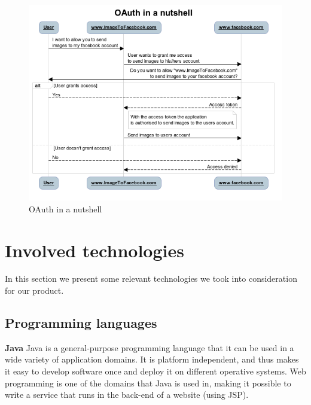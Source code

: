 \begin{figure}[h]
\centering
\includegraphics[scale=1.0]{../Figures/oauth-in-a-nutshell.png}
\caption{OAuth in a nutshell}
\label{figure:oauth-in-a-nutshell}
\end{figure}


\clearpage
\section{Involved technologies}
\label{section:used-technologies}

In this section we present some relevant technologies we took into consideration for our product.

\subsection{Programming languages}

\textbf{Java}\cite{Java}\newline
Java is a general-purpose programming language that it can be used in a wide variety of application domains.
It is platform independent, and thus makes it easy to develop software once and deploy it on different operative systems.
Web programming is one of the domains that Java is used in, making it possible to write a service
that runs in the back-end of a website (using JSP).


